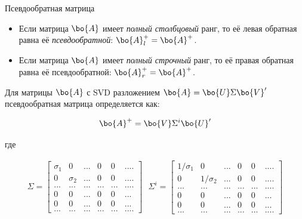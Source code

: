 \documentclass{beamer}
\begin{document}
\begin{frame}{Псевдообратная матрица}
	\begin{flushleft}
		
		{\small
			\begin{itemize}
				
				\item Если матрица $\bo{A}$ имеет \emph{полный столбцовый} ранг, то её левая обратная равна её \emph{псевдообратной}: $\bo{A}^+_l = \bo{A}^+$.
				
				\item Если матрица $\bo{A}$ имеет \emph{полный строчный} ранг, то её правая обратная равна её псевдообратной: $\bo{A}^+_r = \bo{A}^+$.
				
			\end{itemize}
			
			Для матрицы $\bo{A}$ с SVD разложением $\bo{A} = \bo{U} \Sigma \bo{V}'$ псевдообратная матрица определяется как:
			
			\begin{equation}
				\bo{A}^+ = \bo{V} \Sigma^i \bo{U}'
			\end{equation}
			
			где
			
			\begin{align*}
				\Sigma = \begin{bmatrix}
					\sigma_1 & 0 & ... & 0 & 0 & .... \\
					0 & \sigma_2 & ... & 0 & 0 & .... \\
					... & ... &  ... & ... & ... & .... \\
					0& 0& ...& 0 & 0& ... \\
					0& 0& ...& 0 & 0& ... \\
					... & ... &  ... & ... & ... & .... 
				\end{bmatrix} 
				\ \ \
				\Sigma^i  = \begin{bmatrix}
					1 /  \sigma_1 & 0 & ... & 0 & 0 & .... \\
					0 & 1 /  \sigma_2 & ... & 0 & 0 & .... \\
					... & ... &  ... & ... & ... & .... \\
					0& 0& ...& 0 & 0& ... \\
					0& 0& ...& 0 & 0& ... \\
					... & ... &  ... & ... & ... & .... 
				\end{bmatrix}
			\end{align*}		
		}
		
	\end{flushleft}
\end{frame}
\end{document}
